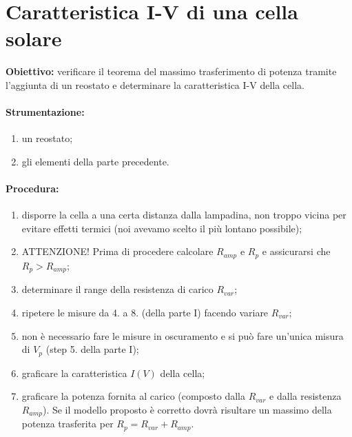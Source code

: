 \section{Caratteristica I-V di una cella solare}

\textbf{Obiettivo:} verificare il teorema del massimo trasferimento di potenza tramite l'aggiunta di un reostato e determinare la caratteristica I-V della cella.

\paragraph{Strumentazione:}
\begin{enumerate}
    \item un reostato;
    \item gli elementi della parte precedente.
\end{enumerate}

\paragraph{Procedura:}
\begin{enumerate}
    \item disporre la cella a una certa distanza dalla lampadina, non troppo vicina per evitare effetti termici (noi avevamo scelto il più lontano possibile);
    \item ATTENZIONE! Prima di procedere calcolare $R_{amp}$ e $R_{p}$ e assicurarsi che $R_p>R_{amp}$;
    \item determinare il range della resistenza di carico $R_{var}$;
    \item ripetere le misure da 4. a 8. (della parte I) facendo variare $R_{var}$;
    \item non è necessario fare le misure in oscuramento e si può fare un'unica misura di $V_p$ (step 5. della parte I);
    \item graficare la caratteristica $I(V)$ della cella;
    \item graficare la potenza fornita al carico (composto dalla $R_{var}$ e dalla resistenza $R_{amp}$). Se il modello proposto è corretto dovrà risultare un massimo della potenza trasferita per $R_p=R_{var}+R_{amp}$.
\end{enumerate}

\setcounter{section}{0}
\renewcommand\thesection{\Alph{section}}

